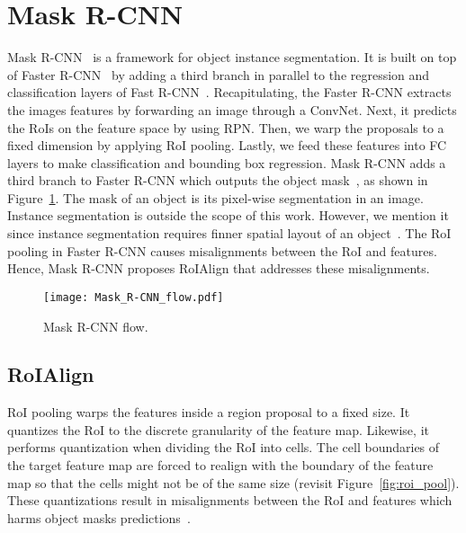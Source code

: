 \section{Mask R-CNN}
%
Mask R-CNN~\cite{He2017mask} is a framework for object instance segmentation.
It is built on top of Faster R-CNN~\cite{Ren2017fasterpami} by adding a third branch in parallel to the regression and classification layers of Fast R-CNN~\cite{Girshick2015}.
Recapitulating, the Faster R-CNN extracts the images features by forwarding an image through a ConvNet.
Next, it predicts the RoIs on the feature space by using RPN.
Then, we warp the proposals to a fixed dimension by applying RoI pooling.
Lastly, we feed these features into FC layers to make classification and bounding box regression.
Mask R-CNN adds a third branch to Faster R-CNN which outputs the object mask~\cite{He2017mask}, as shown in Figure~\ref{fig:mask_r-cnn}.
The mask of an object is its pixel-wise segmentation in an image.
Instance segmentation is outside the scope of this work.
However, we mention it since instance segmentation requires finner spatial layout of an object~\cite{He2017mask}.
The RoI pooling in Faster R-CNN causes misalignments between the RoI and features.
Hence, Mask R-CNN proposes RoIAlign that addresses these misalignments.
%
%
\begin{figure}[th!]
	\centering
	\texttt{[image: Mask\_R-CNN\_flow.pdf]}
	\caption{Mask R-CNN flow.}
	\label{fig:mask_r-cnn}
\end{figure}


\subsection{RoIAlign}
%
RoI pooling warps the features inside a region proposal to a fixed size.
It quantizes the RoI to the discrete granularity of the feature map.
Likewise, it performs quantization when dividing the RoI into cells.
The cell boundaries of the target feature map are forced to realign with the boundary of the feature map so that the cells might not be of the same size (revisit Figure~\ref{fig:roi_pool}).
These quantizations result in misalignments between the RoI and features which harms object masks predictions~\cite{He2017mask}.

